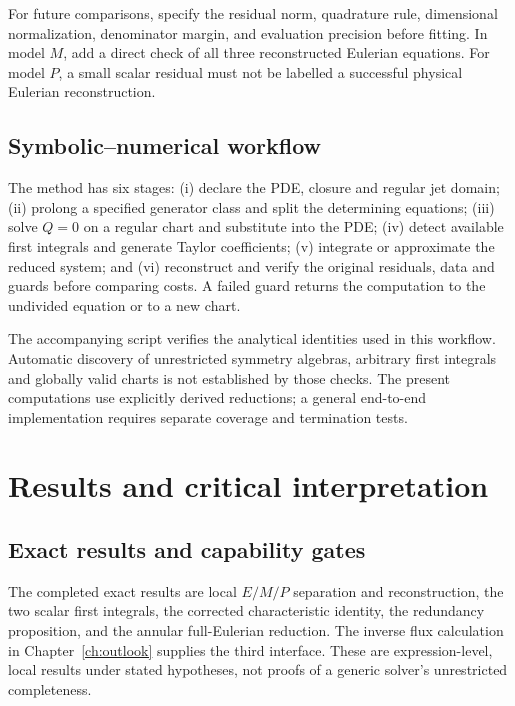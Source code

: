 \documentclass[11pt,a4paper,oneside]{report}
\numberwithin{equation}{chapter}
\begin{document}
For future comparisons, specify the residual norm, quadrature rule, dimensional normalization, denominator margin, and evaluation precision before fitting. In model $M$, add a direct check of all three reconstructed Eulerian equations. For model $P$, a small scalar residual must not be labelled a successful physical Eulerian reconstruction.





\section{Symbolic--numerical workflow}
The method has six stages: (i) declare the PDE, closure and regular jet domain; (ii) prolong a specified generator class and split the determining equations; (iii) solve $Q=0$ on a regular chart and substitute into the PDE; (iv) detect available first integrals and generate Taylor coefficients; (v) integrate or approximate the reduced system; and (vi) reconstruct and verify the original residuals, data and guards before comparing costs. A failed guard returns the computation to the undivided equation or to a new chart.

The accompanying script verifies the analytical identities used in this workflow. Automatic discovery of unrestricted symmetry algebras, arbitrary first integrals and globally valid charts is not established by those checks. The present computations use explicitly derived reductions; a general end-to-end implementation requires separate coverage and termination tests.

\chapter{Results and critical interpretation}\label{ch:results}
\section{Exact results and capability gates}
The completed exact results are local $E/M/P$ separation and reconstruction,
the two scalar first integrals, the corrected characteristic identity,
the redundancy proposition, and the annular full-Eulerian reduction.
The inverse flux calculation in Chapter~\ref{ch:outlook} supplies the third
interface. These are expression-level, local results under stated
hypotheses, not proofs of a generic solver's unrestricted completeness.
\end{document}
